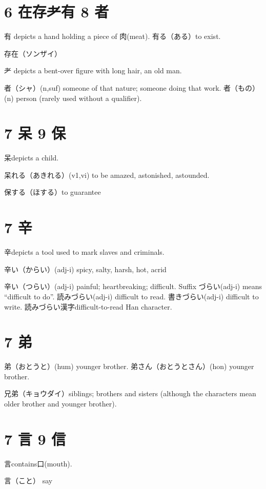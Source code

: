 \section{6 在存耂有 8 者}

有 depicts a hand holding a piece of 肉(meat).
有る（ある）to exist.

存在（ソンザイ）

耂 depicts a bent-over figure with long hair, an old man.

者（シャ）(n,suf) someone of that nature; someone doing that work.
者（もの）(n) person (rarely used without a qualifier).

\section{7 呆 9 保}

呆depicts a child.

呆れる（あきれる）(v1,vi) to be amazed, astonished, astounded.

保する（ほする）to guarantee

\section{7 辛}

辛depicts a tool used to mark slaves and criminals.

辛い（からい）(adj-i) spicy, salty, harsh, hot, acrid

辛い（つらい）(adj-i) painful; heartbreaking; difficult.
Suffix づらい(adj-i) means ``difficult to do''.
読みづらい(adj-i) difficult to read.
書きづらい(adj-i) difficult to write.
読みづらい漢字difficult-to-read Han character.

\section{7 弟}

弟（おとうと）(hum) younger brother.
弟さん（おとうとさん）(hon) younger brother.

兄弟（キョウダイ）siblings;
brothers and sisters
(although the characters mean older brother and younger brother).

\section{7 言 9 信}

言contains口(mouth).

言（こと） say

